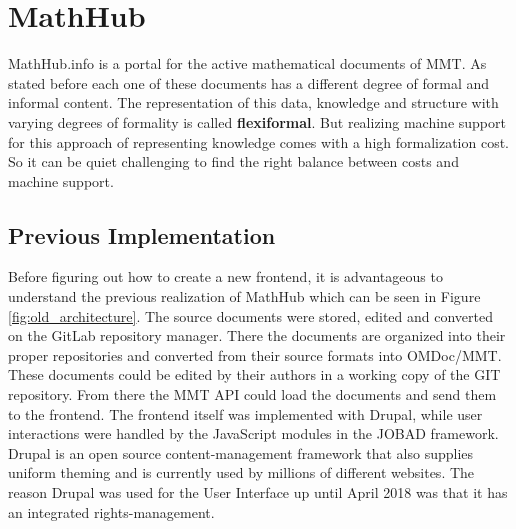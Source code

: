 \documentclass[11pt,a4paper]{article}
\begin{document}
\section{MathHub} \label{mathhub}
MathHub.info is a portal for the active mathematical documents of MMT.
As stated before each one of these documents has a different degree of formal and informal content.
The representation of this data, knowledge and structure with varying degrees of formality is called \textbf{flexiformal}.
But realizing machine support for this approach of representing knowledge comes with a high formalization cost.
So it can be quiet challenging to find the right balance between costs and machine support.
\subsection{Previous Implementation} \label{previous}
Before figuring out how to create a new frontend, it is advantageous to understand the previous realization of MathHub which can be seen in Figure \ref{fig:old_architecture}.
The source documents were stored, edited and converted on the GitLab repository manager.
There the documents are organized into their proper repositories and converted from their source formats into OMDoc/MMT.
These documents could be edited by their authors in a working copy of the GIT repository.
From there the MMT API could load the documents and send them to the frontend.
The frontend itself was implemented with Drupal\cite{comp}, while user interactions were handled by the JavaScript modules in the JOBAD framework.
Drupal is an open source content-management framework that also supplies uniform theming and is currently used by millions of different websites.
The reason Drupal was used for the User Interface up until April 2018 was that it has an integrated rights-management.
\end{document}
